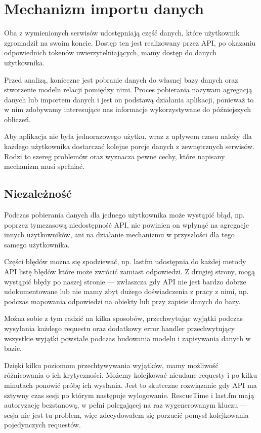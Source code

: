 \documentclass[brudnopis]{xmgr}
\begin{document}
    \section{Mechanizm importu danych}
        Oba z wymienionych serwisów udostępniają część danych, które użytkownik zgromadził na swoim koncie.
        Dostęp ten jest realizowany przez API, po okazaniu odpowiednich tokenów uwierzytelniających, mamy dostęp do danych użytkownika.

        Przed analizą, konieczne jest pobranie danych do własnej bazy danych oraz stworzenie modelu relacji pomiędzy nimi.
        Proces pobierania nazywam agregacją danych lub importem danych i jest on podstawą działania aplikacji,
        ponieważ to w nim zdobywamy interesujące nas informacje wykorzystywane do późniejszych obliczeń.

        Aby aplikacja nie była jednorazowego użytku, wraz z upływem czasu należy dla każdego użytkownika dostarczać
        kolejne porcje danych z zewnętrznych serwisów.
        Rodzi to szereg problemów oraz wyznacza pewne cechy, które napisany mechanizm musi spełniać.

        \subsection*{Niezależność}
            Podczas pobierania danych dla jednego użytkownika może wystąpić błąd, np. poprzez tymczasową niedostępność API,
            nie powinien on wpłynąć na agregacje innych użytkowników, ani na działanie mechanizmu w przyszłości dla tego samego użytkownika.

            Części błędów można się spodziewać, np. lastfm udostępnia do każdej metody API listę błędów które może zwrócić zamiast odpowiedzi.
            Z drugiej strony, mogą wystąpić błędy po naszej stronie --- zwłaszcza gdy API nie jest bardzo dobrze udokumentowane
            lub nie mamy zbyt dużego doświadczenia z pracy z nimi, np. podczas mapowania odpowiedzi na obiekty lub przy zapisie danych do bazy.

            Można sobie z tym radzić na kilka sposobów, przechwytując wyjątki podczas wysyłania każdego requestu
            oraz dodatkowy error handler przechwytujący wszystkie wyjątki powstałe podczas budowania modelu i zapisywania danych w bazie.

            Dzięki kilku poziomom przechtywywania wyjątków, mamy możliwość różnicowania o ich krytyczności. 
            Możemy kolejkować nieudane requesty i po kilku minutach ponowić próbę ich wysłania. Jest to skuteczne rozwiązanie gdy API ma sztywny czas sesji po którym następuje wylogowanie.
            RescueTime i last.fm mają autoryzację bezstanową, w pełni polegającej na raz wygenerowanym kluczu --- sesja nie jest tu problem, więc zdecydowałem się porzucić pomysł kolejkowania pojedynczych requestów.
\end{document}
